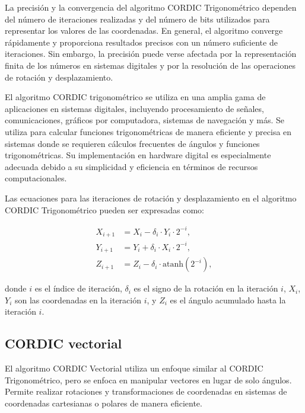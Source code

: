 \documentclass[12pt,a4paper, twoside]{article} %
\begin{document}
La precisión y la convergencia del algoritmo CORDIC Trigonométrico dependen del número de iteraciones realizadas y del número de bits utilizados para representar los valores de las coordenadas. En general, el algoritmo converge rápidamente y proporciona resultados precisos con un número suficiente de iteraciones. Sin embargo, la precisión puede verse afectada por la representación finita de los números en sistemas digitales y por la resolución de las operaciones de rotación y desplazamiento.

El algoritmo CORDIC trigonométrico se utiliza en una amplia gama de aplicaciones en sistemas digitales, incluyendo procesamiento de señales, comunicaciones, gráficos por computadora, sistemas de navegación y más. Se utiliza para calcular funciones trigonométricas de manera eficiente y precisa en sistemas donde se requieren cálculos frecuentes de ángulos y funciones trigonométricas. Su implementación en hardware digital es especialmente adecuada debido a su simplicidad y eficiencia en términos de recursos computacionales.

Las ecuaciones para las iteraciones de rotación y desplazamiento en el algoritmo CORDIC Trigonométrico pueden ser expresadas como:

\begin{equation}
    \begin{aligned}
        X_{i+1} &= X_i - \delta_i \cdot Y_i \cdot 2^{-i}, \\
        Y_{i+1} &= Y_i + \delta_i \cdot X_i \cdot 2^{-i}, \\
        Z_{i+1} &= Z_i - \delta_i \cdot \text{atanh}(2^{-i}),
    \end{aligned}
\end{equation}

donde $i$ es el índice de iteración, $\delta_i$ es el signo de la rotación en la iteración $i$, $X_i$, $Y_i$ son las coordenadas en la iteración $i$, y $Z_i$ es el ángulo acumulado hasta la iteración $i$.  



\subsection{CORDIC vectorial}
\label{sec:orgdaca22c}


El algoritmo CORDIC Vectorial utiliza un enfoque similar al CORDIC Trigonométrico, pero se enfoca en manipular vectores en lugar de solo ángulos. Permite realizar rotaciones y transformaciones de coordenadas en sistemas de coordenadas cartesianas o polares de manera eficiente. 
\end{document}
